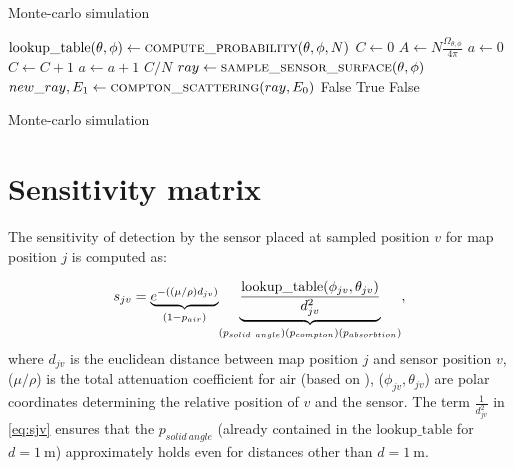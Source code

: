 \begin{algorithm}[h!]
\caption{Monte-carlo simulation}\label{alg:cap}
\begin{algorithmic}
      \State $\mathrm{lookup\_table}(\theta, \phi) \gets \Call{compute\_probability}{\theta, \phi, N}$
    \EndFor
  \EndFor
\EndFunction
\Statex
{}
\State $C \gets 0$
\State $A \gets N\frac{\Omega_{\theta, \phi}}{4 \pi}$ 
\State $a \gets 0$
   
  \State $C \gets C + 1 $ 
  \EndIf
  \State $a \gets a + 1$
\EndWhile
  \State \Return $C/N$ 
  \EndFunction
\Statex
  \State $ray \gets \Call{sample\_sensor\_surface}{\theta,\phi}$ 
   
  \State $new\_ray, E_{1} \gets \Call{compton\_scattering}{ray, E_{0}}$ 
  \Else{}
    \State \Return False 
  \EndIf
    
    \State \Return True
  \Else{}
    \State \Return False
  \EndIf
\EndFunction
\end{algorithmic}
  \label{alg:monte}
  \caption{Monte-carlo simulation}
\end{algorithm}


\section{Sensitivity matrix}
The sensitivity of detection by the sensor placed at sampled position $v$ for map position $j$ is computed as:

\begin{equation}
  s_{jv} = \underset{(1-p_{air})}{\underbrace{e^{-((\mu/\rho) d_{jv})} }} \underset{(p_{solid\ angle})\\(p_{compton})\\(p_{absorbtion})} {\underbrace{\frac{\mathrm{lookup\_table}(\phi_{jv}, \theta_{jv})}{d^{2}_{jv}}}},  
  \label{eq:sjv}
\end{equation}
where $d_{jv}$ is the euclidean distance between map position $j$ and sensor position $v$, ($\mu/\rho$) is the total attenuation coefficient for air (based on \cite{nist}), ($\phi_{jv}, \theta_{jv}$) are polar coordinates determining the relative position of $v$ and the sensor. 
The term $\frac{1}{d^{2}_{jv}}$ in \ref{eq:sjv} ensures that the $p_{solid\ angle}$ (already contained in the $\mathrm{lookup\_table}$ for $d = \SI{1}\meter$) approximately holds even for distances other than $d = \SI{1}\meter$.

